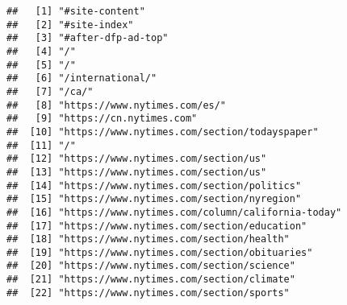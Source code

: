 \documentclass[
]{article}
\begin{document}
\begin{verbatim}
##   [1] "#site-content"                                                                                             
##   [2] "#site-index"                                                                                               
##   [3] "#after-dfp-ad-top"                                                                                         
##   [4] "/"                                                                                                         
##   [5] "/"                                                                                                         
##   [6] "/international/"                                                                                           
##   [7] "/ca/"                                                                                                      
##   [8] "https://www.nytimes.com/es/"                                                                               
##   [9] "https://cn.nytimes.com"                                                                                    
##  [10] "https://www.nytimes.com/section/todayspaper"                                                               
##  [11] "/"                                                                                                         
##  [12] "https://www.nytimes.com/section/us"                                                                        
##  [13] "https://www.nytimes.com/section/us"                                                                        
##  [14] "https://www.nytimes.com/section/politics"                                                                  
##  [15] "https://www.nytimes.com/section/nyregion"                                                                  
##  [16] "https://www.nytimes.com/column/california-today"                                                           
##  [17] "https://www.nytimes.com/section/education"                                                                 
##  [18] "https://www.nytimes.com/section/health"                                                                    
##  [19] "https://www.nytimes.com/section/obituaries"                                                                
##  [20] "https://www.nytimes.com/section/science"                                                                   
##  [21] "https://www.nytimes.com/section/climate"                                                                   
##  [22] "https://www.nytimes.com/section/sports"                                                                    

\end{verbatim}
\end{document}
